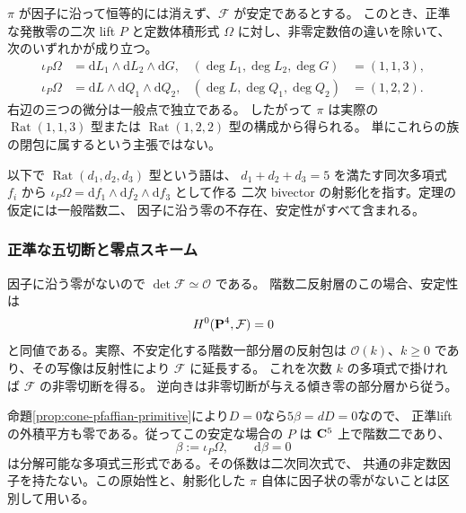 \begin{theorem}[安定・零因子なしの階数二部分]
\label{thm:stable-rank-two-actual-rational}
$\pi$ が因子に沿って恒等的には消えず、$\mathcal F$ が安定であるとする。
このとき、正準な発散零の二次 lift $P$ と定数体積形式
$\Omega$ に対し、非零定数倍の違いを除いて、次のいずれかが成り立つ。
\begin{align}
 \iota_P\Omega&=\mathrm{d} L_1\wedge\mathrm{d} L_2\wedge\mathrm{d} G,
 & (\deg L_1,\deg L_2,\deg G)&=(1,1,3),
 \label{eq:stable-rat113}\\
 \iota_P\Omega&=\mathrm{d} L\wedge\mathrm{d} Q_1\wedge\mathrm{d} Q_2,
 & (\deg L,\deg Q_1,\deg Q_2)&=(1,2,2).
 \label{eq:stable-rat122}
\end{align}
右辺の三つの微分は一般点で独立である。
したがって $\pi$ は実際の $\operatorname{Rat}(1,1,3)$ 型または
$\operatorname{Rat}(1,2,2)$ 型の構成から得られる。
単にこれらの族の閉包に属するという主張ではない。
\end{theorem}

以下で $\operatorname{Rat}(d_1,d_2,d_3)$ 型という語は、
$d_1+d_2+d_3=5$ を満たす同次多項式 $f_i$ から
$\iota_P\Omega=\mathrm{d} f_1\wedge\mathrm{d} f_2\wedge\mathrm{d} f_3$ として作る
二次 bivector の射影化を指す。定理の仮定には一般階数二、
因子に沿う零の不存在、安定性がすべて含まれる。

\subsubsection{正準な五切断と零点スキーム}

因子に沿う零がないので $\det\mathcal F\simeq\mathcal O$ である。
階数二反射層のこの場合、安定性は
\begin{equation}
 H^0(\mathbf P^4,\mathcal F)=0
 \label{eq:stable-no-linear-tangent}
\end{equation}
と同値である。実際、不安定化する階数一部分層の反射包は
$\mathcal O(k)$、$k\geq0$ であり、その写像は反射性により $\mathcal F$ に延長する。
これを次数 $k$ の多項式で掛ければ $\mathcal F$ の非零切断を得る。
逆向きは非零切断が与える傾き零の部分層から従う。

命題\ref{prop:cone-pfaffian-primitive}により$D=0$なら$5\beta=dD=0$なので、
正準liftの外積平方も零である。従ってこの安定な場合の $P$ は
$\mathbf C^5$ 上で階数二であり、
\begin{equation}
 \beta:=\iota_P\Omega,\qquad \mathrm{d}\beta=0
 \label{eq:canonical-beta}
\end{equation}
は分解可能な多項式三形式である。その係数は二次同次式で、
共通の非定数因子を持たない。この原始性と、射影化した
$\pi$ 自体に因子状の零がないことは区別して用いる。

